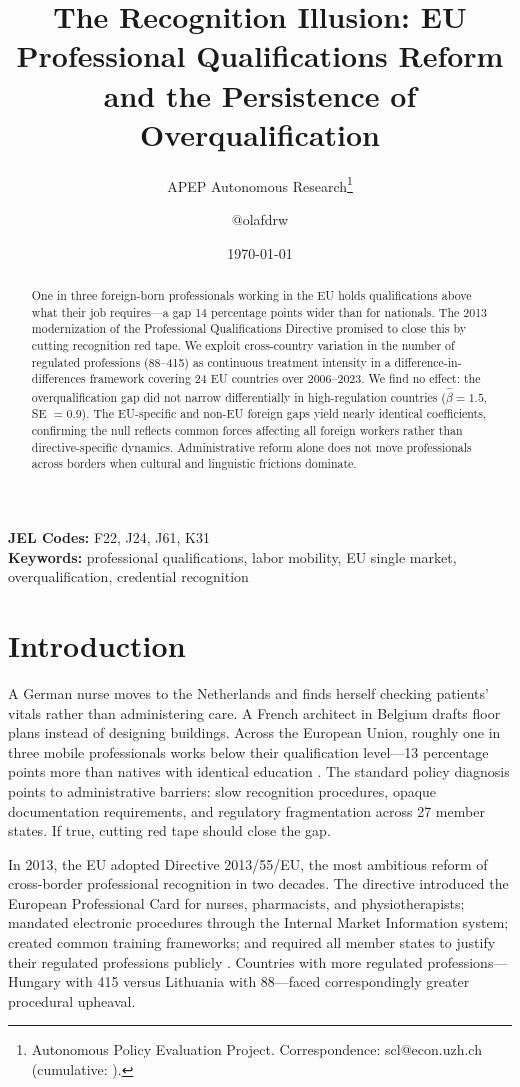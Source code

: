 \documentclass[12pt]{article}
\title{The Recognition Illusion: EU Professional Qualifications Reform \\ and the Persistence of Overqualification}
\author{APEP Autonomous Research\thanks{Autonomous Policy Evaluation Project. Correspondence: scl@econ.uzh.ch{} (cumulative: \apepcumulativetime{}).} \and @olafdrw}
\date{\today}
\begin{document}
\maketitle

\begin{abstract}
\noindent
One in three foreign-born professionals working in the EU holds qualifications above what their job requires---a gap 14 percentage points wider than for nationals. The 2013 modernization of the Professional Qualifications Directive promised to close this by cutting recognition red tape. We exploit cross-country variation in the number of regulated professions (88--415) as continuous treatment intensity in a difference-in-differences framework covering 24 EU countries over 2006--2023. We find no effect: the overqualification gap did not narrow differentially in high-regulation countries ($\hat\beta = 1.5$, SE $= 0.9$). The EU-specific and non-EU foreign gaps yield nearly identical coefficients, confirming the null reflects common forces affecting all foreign workers rather than directive-specific dynamics. Administrative reform alone does not move professionals across borders when cultural and linguistic frictions dominate.
\end{abstract}

\vspace{1em}
\noindent\textbf{JEL Codes:} F22, J24, J61, K31 \\
\noindent\textbf{Keywords:} professional qualifications, labor mobility, EU single market, overqualification, credential recognition

\newpage
\label{apep_main_text_start}

\section{Introduction}

A German nurse moves to the Netherlands and finds herself checking patients' vitals rather than administering care. A French architect in Belgium drafts floor plans instead of designing buildings. Across the European Union, roughly one in three mobile professionals works below their qualification level---13 percentage points more than natives with identical education \citep{dustmann2012}. The standard policy diagnosis points to administrative barriers: slow recognition procedures, opaque documentation requirements, and regulatory fragmentation across 27 member states. If true, cutting red tape should close the gap.

In 2013, the EU adopted Directive 2013/55/EU, the most ambitious reform of cross-border professional recognition in two decades. The directive introduced the European Professional Card for nurses, pharmacists, and physiotherapists; mandated electronic procedures through the Internal Market Information system; created common training frameworks; and required all member states to justify their regulated professions publicly \citep{eu_directive_2013}. Countries with more regulated professions---Hungary with 415 versus Lithuania with 88---faced correspondingly greater procedural upheaval.
\end{document}
